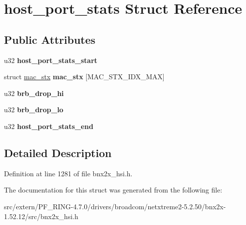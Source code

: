 \hypertarget{structhost__port__stats}{
\section{host\_\-port\_\-stats Struct Reference}
\label{structhost__port__stats}
}
\subsection*{Public Attributes}
\begin{DoxyCompactItemize}
\item 
\hypertarget{structhost__port__stats_aee89f7e7134d582f2b3d913eb948fb13}{
u32 {\bfseries host\_\-port\_\-stats\_\-start}}
\label{structhost__port__stats_aee89f7e7134d582f2b3d913eb948fb13}

\item 
\hypertarget{structhost__port__stats_a4f85b1fc66f1ca7050243f3ec9528160}{
struct \hyperlink{structmac__stx}{mac\_\-stx} {\bfseries mac\_\-stx} \mbox{[}MAC\_\-STX\_\-IDX\_\-MAX\mbox{]}}
\label{structhost__port__stats_a4f85b1fc66f1ca7050243f3ec9528160}

\item 
\hypertarget{structhost__port__stats_ab12d1d9fb916894663aefbba95c21830}{
u32 {\bfseries brb\_\-drop\_\-hi}}
\label{structhost__port__stats_ab12d1d9fb916894663aefbba95c21830}

\item 
\hypertarget{structhost__port__stats_a10e4d848bab3438eee3ce84d1077b194}{
u32 {\bfseries brb\_\-drop\_\-lo}}
\label{structhost__port__stats_a10e4d848bab3438eee3ce84d1077b194}

\item 
\hypertarget{structhost__port__stats_a88040376e2a13628d5ca11c65448311c}{
u32 {\bfseries host\_\-port\_\-stats\_\-end}}
\label{structhost__port__stats_a88040376e2a13628d5ca11c65448311c}

\end{DoxyCompactItemize}


\subsection{Detailed Description}


Definition at line 1281 of file bnx2x\_\-hsi.h.



The documentation for this struct was generated from the following file:\begin{DoxyCompactItemize}
\item 
src/extern/PF\_\-RING-\/4.7.0/drivers/broadcom/netxtreme2-\/5.2.50/bnx2x-\/1.52.12/src/bnx2x\_\-hsi.h\end{DoxyCompactItemize}
